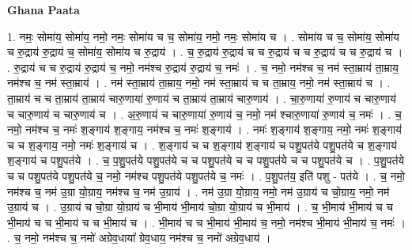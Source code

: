 \documentclass[17pt]{extarticle}
\begin{document}
\textbf{Ghana Paata } \newline

1. नमः॒ सोमा॑य॒ सोमा॑य॒ नमो॒ नमः॒ सोमा॑य च च॒ सोमा॑य॒ नमो॒ नमः॒ सोमा॑य च । . सोमा॑य च च॒ सोमा॑य॒ सोमा॑य च रु॒द्राय॑ रु॒द्राय॑ च॒ सोमा॑य॒ सोमा॑य च रु॒द्राय॑ । . च॒ रु॒द्राय॑ रु॒द्राय॑ च च रु॒द्राय॑ च च रु॒द्राय॑ च च रु॒द्राय॑ च । . रु॒द्राय॑ च च रु॒द्राय॑ रु॒द्राय॑ च॒ नमो॒ नम॑श्च रु॒द्राय॑ रु॒द्राय॑ च॒ नमः॑ । . च॒ नमो॒ नम॑श्च च॒ नम॑ स्ता॒म्राय॑ ता॒म्राय॒ नम॑श्च च॒ नम॑ स्ता॒म्राय॑ । . नम॑ स्ता॒म्राय॑ ता॒म्राय॒ नमो॒ नम॑ स्ता॒म्राय॑ च च ता॒म्राय॒ नमो॒ नम॑ स्ता॒म्राय॑ च । . ता॒म्राय॑ च च ता॒म्राय॑ ता॒म्राय॑ चारु॒णाया॑ रु॒णाय॑ च ता॒म्राय॑ ता॒म्राय॑ चारु॒णाय॑ । . चा॒रु॒णाया॑ रु॒णाय॑ च चारु॒णाय॑ च चारु॒णाय॑ च चारु॒णाय॑ च । . अ॒रु॒णाय॑ च चारु॒णाया॑ रु॒णाय॑ च॒ नमो॒ नम॑ श्चारु॒णाया॑ रु॒णाय॑ च॒ नमः॑ । . च॒ नमो॒ नम॑श्च च॒ नमः॑ श॒ङ्गाय॑ श॒ङ्गाय॒ नम॑श्च च॒ नमः॑ श॒ङ्गाय॑ । . नमः॑ श॒ङ्गाय॑ श॒ङ्गाय॒ नमो॒ नमः॑ श॒ङ्गाय॑ च च श॒ङ्गाय॒ नमो॒ नमः॑ श॒ङ्गाय॑ च । . श॒ङ्गाय॑ च च श॒ङ्गाय॑ श॒ङ्गाय॑ च पशु॒पत॑ये पशु॒पत॑ये च श॒ङ्गाय॑ श॒ङ्गाय॑ च पशु॒पत॑ये । . च॒ प॒शु॒पत॑ये पशु॒पत॑ये च च पशु॒पत॑ये च च पशु॒पत॑ये च च पशु॒पत॑ये च । . प॒शु॒पत॑ये च च पशु॒पत॑ये पशु॒पत॑ये च॒ नमो॒ नम॑श्च पशु॒पत॑ये पशु॒पत॑ये च॒ नमः॑ । . प॒शु॒पत॑य॒ इति॑ पशु - पत॑ये । . च॒ नमो॒ नम॑श्च च॒ नम॑ उ॒ग्रा यो॒ग्राय॒ नम॑श्च च॒ नम॑ उ॒ग्राय॑ । . नम॑ उ॒ग्रा यो॒ग्राय॒ नमो॒ नम॑ उ॒ग्राय॑ च चो॒ग्राय॒ नमो॒ नम॑ उ॒ग्राय॑ च । . उ॒ग्राय॑ च चो॒ग्रा यो॒ग्राय॑ च भी॒माय॑ भी॒माय॑ चो॒ग्रा यो॒ग्राय॑ च भी॒माय॑ । . च॒ भी॒माय॑ भी॒माय॑ च च भी॒माय॑ च च भी॒माय॑ च च भी॒माय॑ च । . भी॒माय॑ च च भी॒माय॑ भी॒माय॑ च॒ नमो॒ नम॑श्च भी॒माय॑ भी॒माय॑ च॒ नमः॑ । . च॒ नमो॒ नम॑श्च च॒ नमो॑ अग्रेव॒धाया᳚ ग्रेव॒धाय॒ नम॑श्च च॒ नमो॑ अग्रेव॒धाय॑ । \newline
\end{document}
